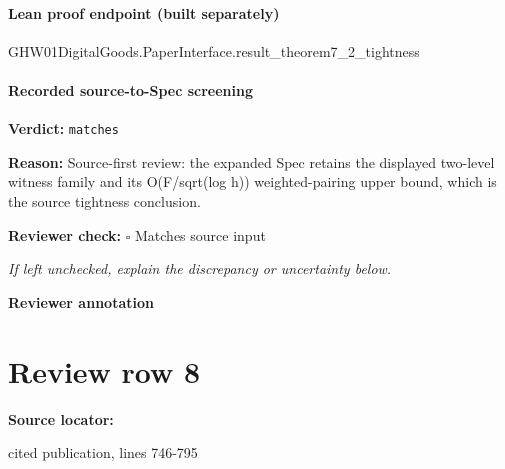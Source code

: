 \documentclass[10pt]{article}
\newcommand{\reviewerbox}{%
  \par\noindent\fbox{\parbox{0.96\linewidth}{\rule{0pt}{0.38in}}}\par
}
\newcommand{\reviewmatch}[1]{%
  \par\noindent\textbf{Reviewer check:} $\square$\; #1\par
  \noindent\emph{If left unchecked, explain the discrepancy or uncertainty below.}\par
}
\begin{document}
\paragraph{Lean proof endpoint (built separately)}\begin{ReviewVerbatim}
GHW01DigitalGoods.PaperInterface.result_theorem7_2_tightness
\end{ReviewVerbatim}

\paragraph{Recorded source-to-Spec screening}
\textbf{Verdict:} \texttt{matches}
\\
{\raggedright
\textbf{Reason:} Source-\allowbreak{}first review:\allowbreak{} the expanded Spec retains the displayed two-\allowbreak{}level witness family and its O(F/\allowbreak{}sqrt(log h)) weighted-\allowbreak{}pairing upper bound, which is the source tightness conclusion.\allowbreak{}
\par}
\reviewmatch{Matches source input}
\noindent\textbf{Reviewer annotation}\par
\reviewerbox
\clearpage
\hypertarget{source-claim-16eee1e38ed670e7}{}
\section*{Review row 8}
\textbf{Source locator:} {\footnotesize\raggedright cited publication, lines 746-\allowbreak{}795\par}
\end{document}
